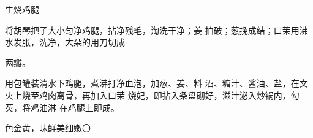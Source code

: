 \begin{recipe}{生烧鸡腿}

\ingredients


\cooking

\step 将胡琴把子大小匀净鸡腿，拈净残毛，淘洗干净；姜 拍破；葱挽成结；口茉用沸水发胀，洗净，大朵的用刀切成

两瓣。

\step 用包罐装清水下鸡腿，煮沸打净血泡，加葱、姜、料 酒、糖汁、酱油、盐，在文火上烧至鸡肉离骨，再加入口茉 烧妃，即拈入条盘砌好，滋汁泌入炒锅内，勾芡，将鸡油淋 在鸡腿上即成。

\notes

色金黄，昧鲜美细嫩〇

\end{recipe}


